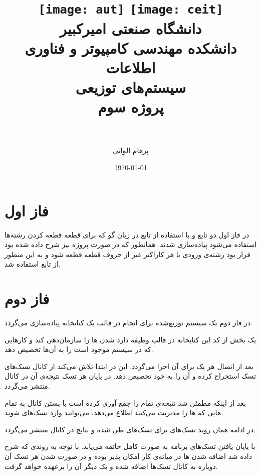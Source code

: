\documentclass[paper=a4, fontsize=11pt]{article}
\title{
\normalfont\normalsize
\texttt{[image: aut]}
\hspace{5cm}
\texttt{[image: ceit]} \\
\textsc دانشگاه صنعتی امیرکبیر \\
\textsc دانشکده مهندسی کامپیوتر و فناوری اطلاعات
\horrule{0.5pt} \\ [0.4cm] %
\huge سیستم‌های توزیعی \\ %
\huge پروژه سوم \\ %
\horrule{2pt} \\ [0.5cm] %
}
\author{پرهام الوانی}
\date{\normalsize\today} %
\numberwithin{equation}{section} %
\numberwithin{figure}{section} %
\numberwithin{table}{section} %
\begin{document}
\maketitle %

\section{فاز اول}

\par
در فاز اول دو تابع  و 
با استفاده از تابع  در زبان گو
که برای قطعه قطعه کردن رشته‌ها استفاده می‌شود پیاده‌سازی شدند.
همانطور که در صورت پروژه نیز شرح داده شده بود قرار بود رشته‌ی ورودی
با هر کاراکتر غیر از حروف قطعه قطعه شود و
به این منظور از تابع  استفاده شد.

\section{فاز دوم}

\par
در فاز دوم یک سیستم توزیع‌شده برای انجام 
در قالب یک کتابخانه پیاده‌سازی می‌گردد.

\par
یک بخش از کد این کتابخانه در قالب 
وظیفه دارد  شدن
ها
را سازمان‌دهی کند و کارهایی که در سیستم موجود است را به آن‌ها تخصیص دهد.

\par
بعد از اتصال هر  یک 
برای آن اجرا می‌گردد. این 
در ابتدا تلاش می‌کند از کانال  تسک‌های 
تسک استخراج کرده و آن را به 
خود تخصیص دهد. در پایان هر تسک نتیجه‌ی آن
در کانال  منتشر می‌گردد.

\par
بعد از اینکه  مطمئن شد نتیجه‌ی تمام 
را جمع آوری کرده است با بستن کانال 
به تمام هایی
که ها را مدیریت می‌کنند
اطلاع می‌دهد، می‌توانند وارد تسک‌های  شوند.

\par
در ادامه همان روند تسک‌های  برای تسک‌های 
طی شده و نتایج در کانال  منتشر می‌گردد.

\par
با پایان یافتن تسک‌های  برنامه به صورت کامل خاتمه می‌یابد.
با توجه به روندی که شرح داده شد اضافه شدن ها در میانه‌ی کار
امکان پذیر بوده و در صورت  شدن هر 
تسک آن دوباره به کانال تسک‌ها اضافه شده و یک 
دیگر آن را برعهده خواهد گرفت.
\end{document}
